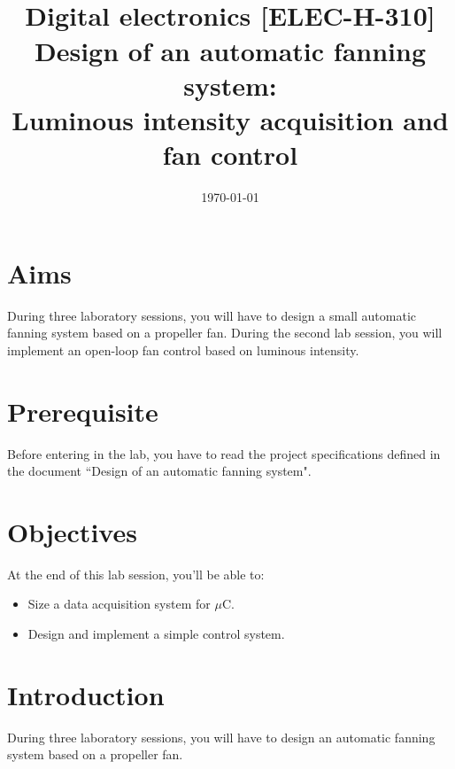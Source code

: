 \documentclass[11pt,a4paper]{article}
\date{\vspace{-1.7cm}\mydate\today}
\title{\vspace{-2cm}\labonumber \\ Digital electronics [ELEC-H-310]\\Design of an automatic fanning system: \\ Luminous intensity acquisition and fan control\ifthenelse{\boolean{corrige}}{~\\Corrigé}{}}
\theoremstyle{definition}%
\begin{document}
\maketitle





\section*{Aims}
During three laboratory sessions, you will have to design a small automatic fanning system based on a propeller fan.
During the second lab session, you will implement an open-loop fan control based on luminous intensity.

\section*{Prerequisite}
Before entering in the lab, you have to read the project specifications defined in the document ``Design of an automatic fanning system".


\section*{Objectives}
At the end of this lab session, you'll be able to:
\begin{itemize}
	\item Size a data acquisition system for $\mu$C.
	\item Design and implement a simple control system.
\end{itemize}


\newpage






\section{Introduction}
During three laboratory sessions, you will have to design an automatic fanning system based on a propeller fan.
\end{document}
